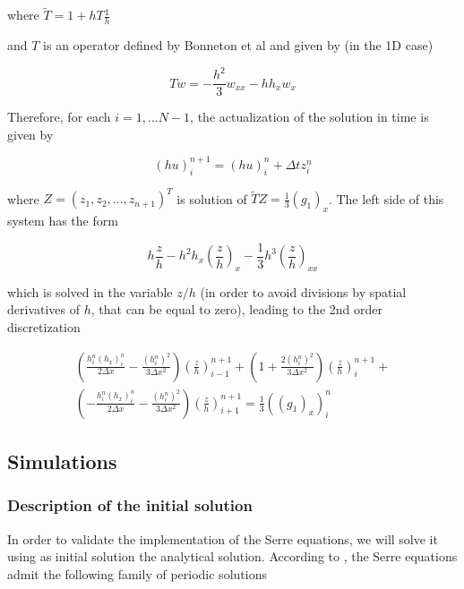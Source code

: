 \noindent where $\tilde{T} = 1 + hT\frac{1}{h} $

\noindent and $T$ is an operator defined by Bonneton et al and given by (in the 1D case)

\begin{equation}
   Tw = -\frac{h^2}{3}w_{xx} - hh_xw_x
\end{equation}

\indent Therefore, for each $i=1,...N-1$, the actualization of the solution in time is given by

\begin{equation}
(hu)_i^{n+1} = (hu)_i^n + \Delta t z_i^n
\end{equation}

\noindent where $Z = (z_1,z_2,...,z_{n+1})^T$ is solution of $\tilde{T}Z = \frac{1}{3}\left(g_1 \right)_x$. The left side of this system has the form

\begin{equation}
h\frac{z}{h} - h^2h_x \left( \frac{z}{h} \right)_x - \frac{1}{3}h^3\left( \frac{z}{h}\right)_{xx}
\end{equation}

\noindent which is solved in the variable $z/h$ (in order to avoid divisions by spatial derivatives of $h$, that can be equal to zero), leading to the 2nd order discretization

\begin{equation}
\begin{split}
\left( \frac{h_i^n(h_x)_i^n}{2\Delta x} - \frac{(h_i^n)^2}{3\Delta x^2} \right)  \left( \frac{z}{h} \right)_{i-1}^{n+1} + 
 \left( 1 + \frac{2(h_i^n)^2}{3\Delta x^2} \right)\left( \frac{z}{h} \right)_{i}^{n+1} + \\
  \left( -\frac{h_i^n(h_x)_i^n}{2\Delta x} - \frac{(h_i^n)^2}{3\Delta x^2} \right)\left( \frac{z}{h} \right)_{i+1}^{n+1} = \frac{1}{3} \left(\left( g_1 \right)_x\right)_i^n
  \end{split}
\end{equation}

\subsection{Simulations}

\subsubsection{Description of the initial solution}

\indent In order to validate the implementation of the Serre equations, we will solve it using as initial solution the analytical solution. According to \cite{CarterCienfuegos2011}, the Serre equations admit the following family of periodic solutions

